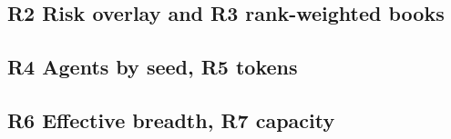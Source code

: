 \subsection*{R2 Risk overlay and R3 rank-weighted books \hfill \tagp}
{\footnotesize\setlength{\tabcolsep}{3pt}}\par\medskip
{\footnotesize\setlength{\tabcolsep}{3pt}}\par\medskip
{\footnotesize\setlength{\tabcolsep}{3pt}}\par\medskip
\subsection*{R4 Agents by seed, R5 tokens \hfill \tagp}
{\footnotesize\setlength{\tabcolsep}{3pt}}\par\medskip
{\scriptsize\setlength{\tabcolsep}{3pt}\resizebox{\textwidth}{!}{}}\par\medskip
{\footnotesize\setlength{\tabcolsep}{3pt}}\par\medskip
{\footnotesize\setlength{\tabcolsep}{3pt}}\par\medskip
\subsection*{R6 Effective breadth, R7 capacity \hfill \tagp}
{\footnotesize\setlength{\tabcolsep}{3pt}}\par\medskip
{\scriptsize\setlength{\tabcolsep}{3pt}\resizebox{\textwidth}{!}{}}\par\medskip
{\scriptsize\setlength{\tabcolsep}{3pt}\resizebox{\textwidth}{!}{}}\par\medskip
{\scriptsize\setlength{\tabcolsep}{3pt}\resizebox{\textwidth}{!}{}}\par\medskip

